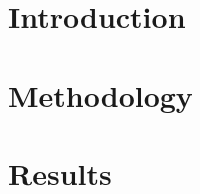 \documentclass[preprint,authoryear,3p,twocolumn]{elsarticle}
\begin{document}




\maketitle

\section{Introduction} %


\section{Methodology}
\label{ch:metodologia}


\section{Results}
\label{ch:resultados}




%
\end{document}

